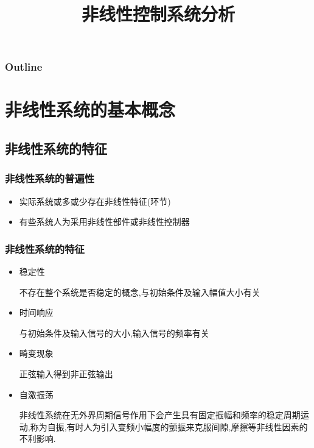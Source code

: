\documentclass[table]{article}
\subtitle{}
\title{非线性控制系统分析}
\author{}
\date{}
\begin{document}
\maketitle

\begin{frame}
\frametitle{Outline}
\setcounter{tocdepth}{3}
\tableofcontents
\end{frame}












\section{非线性系统的基本概念}
\label{sec-1}
\subsection{非线性系统的特征}
\label{sec-1-1}
\begin{frame}
\frametitle{非线性系统的普遍性}
\label{sec-1-1-1}

\begin{itemize}
\item 实际系统或多或少存在非线性特征(环节)
\item <2->有些系统人为采用非线性部件或非线性控制器
\end{itemize}
\end{frame}
\begin{frame}
\frametitle{非线性系统的特征}
\label{sec-1-1-2}

\begin{itemize}
\item <2->稳定性

    不存在整个系统是否稳定的概念,与初始条件及输入幅值大小有关
\item <3->时间响应

    与初始条件及输入信号的大小,输入信号的频率有关
\item <4->畸变现象

    正弦输入得到非正弦输出
\item <5->自激振荡

    非线性系统在无外界周期信号作用下会产生具有固定振幅和频率的稳定周期运动,称为自振,有时人为引入变频小幅度的颤振来克服间隙,摩擦等非线性因素的不利影响.
\end{itemize}
\end{frame}
\end{document}
